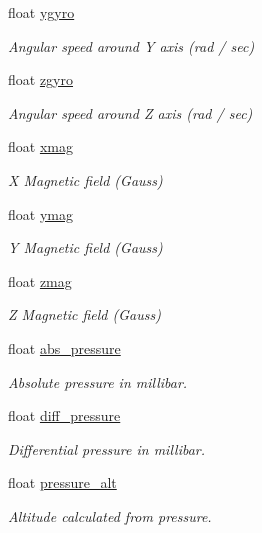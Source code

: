 \begin{DoxyCompactItemize}
float \hyperlink{struct____mavlink__highres__imu__t_a593f56b2ae4f9d85c8e9f8a06e28aef3}{ygyro}
\begin{DoxyCompactList}\small\item\em Angular speed around Y axis (rad / sec) \end{DoxyCompactList}\item 
float \hyperlink{struct____mavlink__highres__imu__t_a3e5d5462ef68fe4fea7811c082ddb186}{zgyro}
\begin{DoxyCompactList}\small\item\em Angular speed around Z axis (rad / sec) \end{DoxyCompactList}\item 
float \hyperlink{struct____mavlink__highres__imu__t_a82d9c25f53b9ee64f48c99f45eaead70}{xmag}
\begin{DoxyCompactList}\small\item\em X Magnetic field (Gauss) \end{DoxyCompactList}\item 
float \hyperlink{struct____mavlink__highres__imu__t_aa887e516e745fef0f051856c46b8e0f6}{ymag}
\begin{DoxyCompactList}\small\item\em Y Magnetic field (Gauss) \end{DoxyCompactList}\item 
float \hyperlink{struct____mavlink__highres__imu__t_abf5f119c9468cfaeb83d757997024a57}{zmag}
\begin{DoxyCompactList}\small\item\em Z Magnetic field (Gauss) \end{DoxyCompactList}\item 
float \hyperlink{struct____mavlink__highres__imu__t_a0db713a894b40a11ee5b0cddc1629353}{abs\+\_\+pressure}
\begin{DoxyCompactList}\small\item\em Absolute pressure in millibar. \end{DoxyCompactList}\item 
float \hyperlink{struct____mavlink__highres__imu__t_a5902061bb3028121e55ce9641e844334}{diff\+\_\+pressure}
\begin{DoxyCompactList}\small\item\em Differential pressure in millibar. \end{DoxyCompactList}\item 
float \hyperlink{struct____mavlink__highres__imu__t_ae540d0d0572455b1fc44123d3a3b6405}{pressure\+\_\+alt}
\begin{DoxyCompactList}\small\item\em Altitude calculated from pressure. \end{DoxyCompactList}\item 

\end{DoxyCompactItemize}
